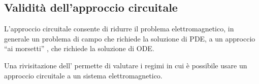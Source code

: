 \documentclass[letterpaper,10pt,english]{jupyterBook}
\begin{document}
\sphinxAtStartPar
{}

\sphinxAtStartPar
{}

\sphinxstepscope




\subsection{Validità dell’approccio circuitale}
\label{\detokenize{ch/circuits-electric-approximation:validita-dell-approccio-circuitale}}\label{\detokenize{ch/circuits-electric-approximation:classical-electromagnetism-circuits-electric-approximation}}\label{\detokenize{ch/circuits-electric-approximation::doc}}
\sphinxAtStartPar
L’approccio circuitale consente di ridurre il problema elettromagnetico, in generale un problema di campo che richiede la soluzione di PDE, a un approccio “ai morsetti” , che richiede la soluzione di ODE.

\sphinxAtStartPar
Una rivisitazione dell’{\hyperref[\detokenize{ch/energy:classical-electromagnetism-energy}]{}} permette di valutare i regimi in cui è possibile usare un approccio circuitale a un sistema elettromagnetico.
\end{document}
